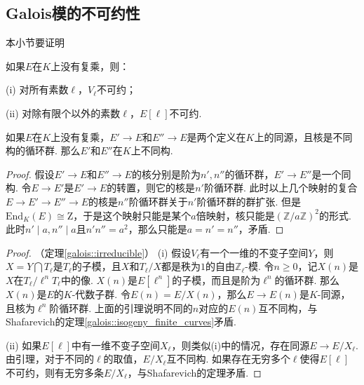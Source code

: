 \subsection{Galois模的不可约性}

本小节要证明

\begin{cthm}
    如果$E$在$K$上没有复乘，则：

    (i) 对所有素数$\ell$，$V_{\ell}$不可约；

    (ii) 对除有限个以外的素数$\ell$，$E[\ell]$不可约.
    \label{galois::irreducible}
\end{cthm}

\begin{clem}
    如果$E$在$K$上没有复乘，$E'\to E$和$E''\to E$是两个定义在$K$上的同源，且核是不同构的循环群. 那么$E'$和$E''$在$K$上不同构.
\end{clem}

\begin{proof}
    假设$E'\to E$和$E''\to E$的核分别是阶为$n', n''$的循环群，$E'\to E''$是一个同构. 令$E\to E'$是$E'\to E$的转置，则它的核是$n'$阶循环群. 此时以上几个映射的复合$E\to E'\to E''\to E$的核是$n''$阶循环群关于$n'$阶循环群的群扩张. 但是$\mathrm{End}_K(E) \cong \mathrm{Z}$，于是这个映射只能是某个$a$倍映射，核只能是$(\mathbb{Z}/a\mathbb{Z})^2$的形式. 此时$n'\mid a, n''\mid a$且$n'n''=a^2$，那么只能是$a=n'=n''$，矛盾.
\end{proof}

\begin{proof}
    （定理\ref{galois::irreducible}）
    (i) 假设$V_{\ell}$有一个一维的不变子空间$Y$，则$X=Y\bigcap T_{\ell}$是$T_{\ell}$的子模，且$X$和$T_{\ell}/X$都是秩为$1$的自由$\mathbb{Z}_{\ell}$-模. 令$n\geq 0$，记$X(n)$是$X$在$T_{\ell} / \ell^n T_{\ell}$中的像. $X(n)$是$E[\ell^n]$的子模，而且是阶为$\ell^n$的循环群. 那么$X(n)$是$E$的$K$-代数子群. 令$E(n) = E/X(n)$，那么$E\to E(n)$是$K$-同源，且核为$\ell^n$阶循环群. 上面的引理说明不同的$n$对应的$E(n)$互不同构，与Shafarevich的定理\ref{galois::isogeny_finite_curves}矛盾.

    (ii) 如果$E[\ell]$中有一维不变子空间$X_{\ell}$，则类似(i)中的情况，存在同源$E\to E/X_{\ell}$. 由引理，对于不同的$\ell$的取值，$E/X_{\ell}$互不同构. 如果存在无穷多个$\ell$使得$E[\ell]$不可约，则有无穷多条$E/X_{\ell}$，与Shafarevich的定理矛盾.
\end{proof}
